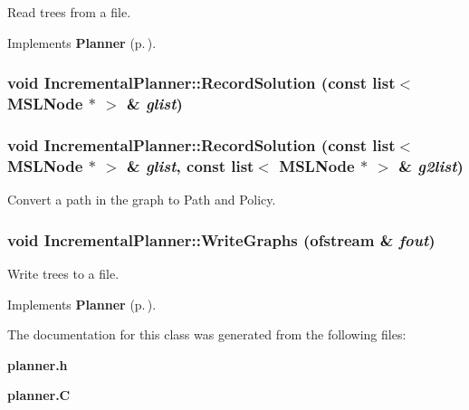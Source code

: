 Read trees from a file.



Implements {\bf Planner} {\rm (p.\,\pageref{classPlanner_a6})}.
\subsubsection{\setlength{\rightskip}{0pt plus 5cm}void Incremental\-Planner::Record\-Solution (const list$<$ {\bf MSLNode} $\ast$ $>$ \& {\em glist})}\label{classIncrementalPlanner_a4}


\subsubsection{\setlength{\rightskip}{0pt plus 5cm}void Incremental\-Planner::Record\-Solution (const list$<$ {\bf MSLNode} $\ast$ $>$ \& {\em glist}, const list$<$ {\bf MSLNode} $\ast$ $>$ \& {\em g2list})}\label{classIncrementalPlanner_a3}


Convert a path in the graph to Path and Policy.

\subsubsection{\setlength{\rightskip}{0pt plus 5cm}void Incremental\-Planner::Write\-Graphs (ofstream \& {\em fout})\hspace{0.3cm}{\tt  [virtual]}}\label{classIncrementalPlanner_a5}


Write trees to a file.



Implements {\bf Planner} {\rm (p.\,\pageref{classPlanner_a5})}.

The documentation for this class was generated from the following files:\begin{CompactItemize}
\item 
{\bf planner.h}\item 
{\bf planner.C}\end{CompactItemize}
